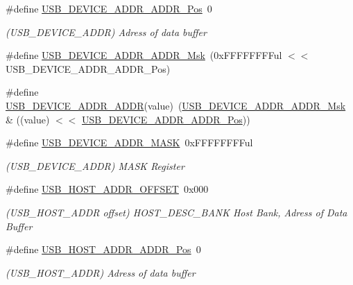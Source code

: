 \begin{DoxyCompactItemize}
\#define \mbox{\hyperlink{group___s_a_m_d21___u_s_b_gaf11069ea7afed69a6206aed4d5127dab}{U\+S\+B\+\_\+\+D\+E\+V\+I\+C\+E\+\_\+\+A\+D\+D\+R\+\_\+\+A\+D\+D\+R\+\_\+\+Pos}}~0
\begin{DoxyCompactList}\small\item\em (U\+S\+B\+\_\+\+D\+E\+V\+I\+C\+E\+\_\+\+A\+D\+DR) Adress of data buffer \end{DoxyCompactList}\item 
\#define \mbox{\hyperlink{group___s_a_m_d21___u_s_b_ga730864a840b90ba51155d5722cf230a0}{U\+S\+B\+\_\+\+D\+E\+V\+I\+C\+E\+\_\+\+A\+D\+D\+R\+\_\+\+A\+D\+D\+R\+\_\+\+Msk}}~(0x\+F\+F\+F\+F\+F\+F\+F\+Ful $<$$<$ U\+S\+B\+\_\+\+D\+E\+V\+I\+C\+E\+\_\+\+A\+D\+D\+R\+\_\+\+A\+D\+D\+R\+\_\+\+Pos)
\item 
\#define \mbox{\hyperlink{group___s_a_m_d21___u_s_b_ga841836a16765cae5ee0d92a955fbf777}{U\+S\+B\+\_\+\+D\+E\+V\+I\+C\+E\+\_\+\+A\+D\+D\+R\+\_\+\+A\+D\+DR}}(value)~(\mbox{\hyperlink{group___s_a_m_d21___u_s_b_ga730864a840b90ba51155d5722cf230a0}{U\+S\+B\+\_\+\+D\+E\+V\+I\+C\+E\+\_\+\+A\+D\+D\+R\+\_\+\+A\+D\+D\+R\+\_\+\+Msk}} \& ((value) $<$$<$ \mbox{\hyperlink{group___s_a_m_d21___u_s_b_gaf11069ea7afed69a6206aed4d5127dab}{U\+S\+B\+\_\+\+D\+E\+V\+I\+C\+E\+\_\+\+A\+D\+D\+R\+\_\+\+A\+D\+D\+R\+\_\+\+Pos}}))
\item 
\#define \mbox{\hyperlink{group___s_a_m_d21___u_s_b_ga8ee19e5cf7a507960a4467b29b526a51}{U\+S\+B\+\_\+\+D\+E\+V\+I\+C\+E\+\_\+\+A\+D\+D\+R\+\_\+\+M\+A\+SK}}~0x\+F\+F\+F\+F\+F\+F\+F\+Ful
\begin{DoxyCompactList}\small\item\em (U\+S\+B\+\_\+\+D\+E\+V\+I\+C\+E\+\_\+\+A\+D\+DR) M\+A\+SK Register \end{DoxyCompactList}\item 
\#define \mbox{\hyperlink{group___s_a_m_d21___u_s_b_gacbc434692759da5ecc14e43025383849}{U\+S\+B\+\_\+\+H\+O\+S\+T\+\_\+\+A\+D\+D\+R\+\_\+\+O\+F\+F\+S\+ET}}~0x000
\begin{DoxyCompactList}\small\item\em (U\+S\+B\+\_\+\+H\+O\+S\+T\+\_\+\+A\+D\+DR offset) H\+O\+S\+T\+\_\+\+D\+E\+S\+C\+\_\+\+B\+A\+NK Host Bank, Adress of Data Buffer \end{DoxyCompactList}\item 
\#define \mbox{\hyperlink{group___s_a_m_d21___u_s_b_ga608a4201f066a3b5f143967efd6b13b6}{U\+S\+B\+\_\+\+H\+O\+S\+T\+\_\+\+A\+D\+D\+R\+\_\+\+A\+D\+D\+R\+\_\+\+Pos}}~0
\begin{DoxyCompactList}\small\item\em (U\+S\+B\+\_\+\+H\+O\+S\+T\+\_\+\+A\+D\+DR) Adress of data buffer \end{DoxyCompactList}\item 

\end{DoxyCompactItemize}
